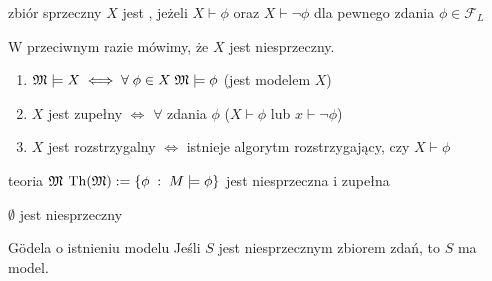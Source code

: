 \begin{definition}{zbiór sprzeczny}{}
  $X$ jest , jeżeli $X\vdash\phi$ oraz $X\vdash\neg\phi$ dla pewnego zdania $\phi\in\mathcal{F}_L$
\end{definition}

W przeciwnym razie mówimy, że $X$ jest niesprzeczny.

\begin{definition}{}{}
  \begin{enumerate}
    \item $\mathfrak{M}\models X\iff \forall\;\phi\in X\;\mathfrak{M}\models\phi$ (\Mm jest modelem $X$)
    \item $X$ jest zupełny $\iff$ $\forall$ zdania $\phi$ ($X\vdash \phi$ lub $x\vdash\neg\phi$)
    \item $X$ jest rozstrzygalny $\iff$ istnieje algorytm rozstrzygający, czy $X\vdash\phi$
  \end{enumerate}
\end{definition}

\begin{example}[m]
\item teoria $\mathfrak{M}$ $\operatorname{Th}(\mathfrak{M}):=\{\phi\;:\;M\models\phi\}$ jest niesprzeczna i zupełna
\item $\emptyset$ jest niesprzeczny
\end{example}

\begin{theorem}{G\"odela o istnieniu modelu}{}
  Jeśli $S$ jest niesprzecznym zbiorem zdań, to $S$ ma model.
\end{theorem}

